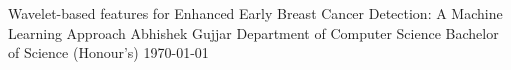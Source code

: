 \documentclass[letterpaper,12pt]{report}
\begin{document}
\thesistitle
	{Wavelet-based features for Enhanced Early Breast Cancer Detection: A Machine Learning Approach}
	{Abhishek Gujjar}
	{Department of Computer Science}
	{Bachelor of Science (Honour's)}
	{\today}

\newpage
{}




\tableofcontents
\listoffigures
{}
\listoftables
{}


\newpage
{}






{}


\end{document}
